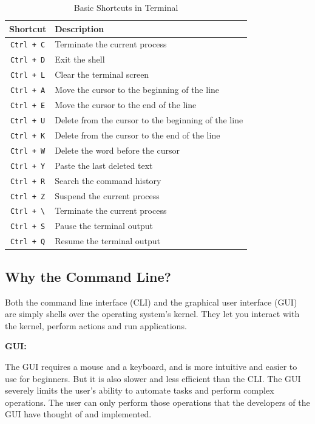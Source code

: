 \begin{table}[h!]
\caption{Basic Shortcuts in Terminal}
\begin{tabular}{ c l }
  \toprule
 Shortcut & Description \\
 \midrule
  \lstinline|Ctrl + C| & Terminate the current process\\
  \lstinline|Ctrl + D| & Exit the shell \\
  \lstinline|Ctrl + L| & Clear the terminal screen \\
  \lstinline|Ctrl + A| & Move the cursor to the beginning of the line \\
  \lstinline|Ctrl + E| & Move the cursor to the end of the line \\
  \lstinline|Ctrl + U| & Delete from the cursor to the beginning of the line \\
  \lstinline|Ctrl + K| & Delete from the cursor to the end of the line \\
  \lstinline|Ctrl + W| & Delete the word before the cursor \\
  \lstinline|Ctrl + Y| & Paste the last deleted text \\
  \lstinline|Ctrl + R| & Search the command history \\
  \lstinline|Ctrl + Z| & Suspend the current process \\
  \lstinline|Ctrl + \| & Terminate the current process \\
  \lstinline|Ctrl + S| & Pause the terminal output \\
  \lstinline|Ctrl + Q| & Resume the terminal output \\
  \bottomrule
\end{tabular}
\end{table}


\subsection{Why the Command Line?}

Both the command line interface (CLI) and the graphical user interface (GUI) are simply shells over the operating system's kernel.
They let you interact with the kernel, perform actions and run applications.

\textbf{GUI:}

The GUI requires a mouse and a keyboard, and is more intuitive and easier to use for beginners.
But it is also slower and less efficient than the CLI.
The GUI severely limits the user's ability to automate tasks and perform complex operations.
The user can only perform those operations that the developers of the GUI have thought of and implemented.

